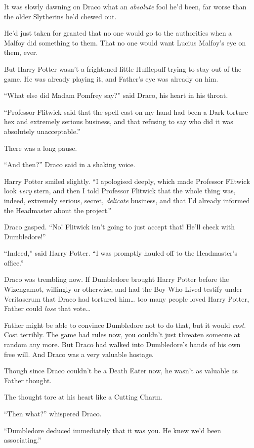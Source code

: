 It was slowly dawning on Draco what an \emph{absolute} fool he'd been,
far worse than the older Slytherins he'd chewed out.

He'd just taken for granted that no one would go to the authorities when
a Malfoy did something to them. That no one would want Lucius Malfoy's
eye on them, ever.

But Harry Potter wasn't a frightened little Hufflepuff trying to stay
out of the game. He was already playing it, and Father's eye was already
on him.

``What else did Madam Pomfrey say?'' said Draco, his heart in his
throat.

``Professor Flitwick said that the spell cast on my hand had been a Dark
torture hex and extremely serious business, and that refusing to say who
did it was absolutely unacceptable.''

There was a long pause.

``And then?'' Draco said in a shaking voice.

Harry Potter smiled slightly. ``I apologised deeply, which made
Professor Flitwick look \emph{very} stern, and then I told Professor
Flitwick that the whole thing was, indeed, extremely serious, secret,
\emph{delicate} business, and that I'd already informed the Headmaster
about the project.''

Draco gasped. ``No! Flitwick isn't going to just accept that! He'll
check with Dumbledore!''

``Indeed,'' said Harry Potter. ``I was promptly hauled off to the
Headmaster's office.''

Draco was trembling now. If Dumbledore brought Harry Potter before the
Wizengamot, willingly or otherwise, and had the Boy-Who-Lived testify
under Veritaserum that Draco had tortured him\ldots{} too many people
loved Harry Potter, Father could \emph{lose} that vote\ldots{}

Father might be able to convince Dumbledore not to do that, but it would
\emph{cost.} Cost terribly. The game had rules now, you couldn't just
threaten someone at random any more. But Draco had walked into
Dumbledore's hands of his own free will. And Draco was a very valuable
hostage.

Though since Draco couldn't be a Death Eater now, he wasn't as valuable
as Father thought.

The thought tore at his heart like a Cutting Charm.

``Then what?'' whispered Draco.

``Dumbledore deduced immediately that it was you. He knew we'd been
associating.''

